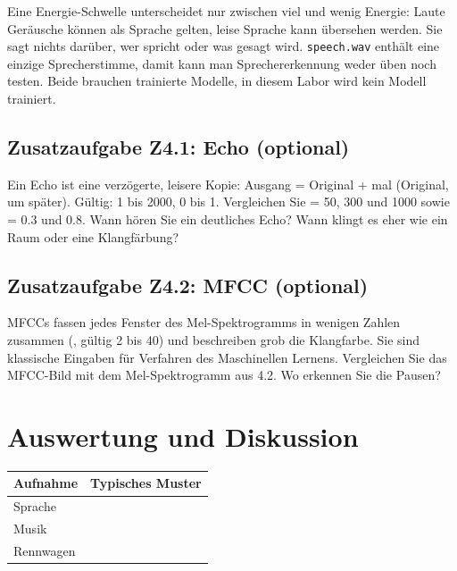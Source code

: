 \documentclass[11pt]{article}
\begin{document}
\medskip
Eine Energie-Schwelle unterscheidet nur zwischen viel und wenig Energie: Laute Geräusche können als Sprache gelten, leise Sprache kann übersehen werden. Sie sagt nichts darüber, wer spricht oder was gesagt wird. \texttt{speech.wav} enthält eine einzige Sprecherstimme, damit kann man Sprechererkennung weder üben noch testen. Beide brauchen trainierte Modelle, in diesem Labor wird kein Modell trainiert.

\subsection[Zusatzaufgabe Z4.1: Echo]{Zusatzaufgabe Z4.1: Echo (optional)}

Ein Echo ist eine verzögerte, leisere Kopie: Ausgang = Original +  mal (Original, um  später). Gültig:  1 bis 2000,  0 bis 1. Vergleichen Sie  = 50, 300 und 1000 sowie  = 0.3 und 0.8. Wann hören Sie ein deutliches Echo? Wann klingt es eher wie ein Raum oder eine Klangfärbung?

\subsection[Zusatzaufgabe Z4.2: MFCC]{Zusatzaufgabe Z4.2: MFCC (optional)}

MFCCs fassen jedes Fenster des Mel-Spektrogramms in wenigen Zahlen zusammen (, gültig 2 bis 40) und beschreiben grob die Klangfarbe. Sie sind klassische Eingaben für Verfahren des Maschinellen Lernens. Vergleichen Sie das MFCC-Bild mit dem Mel-Spektrogramm aus 4.2. Wo erkennen Sie die Pausen?

\clearpage
\section{Auswertung und Diskussion}

\begin{tabularx}{\linewidth}{|L{2.4cm}|Y|}
  \hline
  \textbf{Aufnahme} & \textbf{Typisches Muster} \\ \hline
  Sprache\rule{0pt}{1.1cm} & \\ \hline
  Musik\rule{0pt}{1.1cm} & \\ \hline
  Rennwagen\rule{0pt}{1.1cm} & \\ \hline
\end{tabularx}
\end{document}
